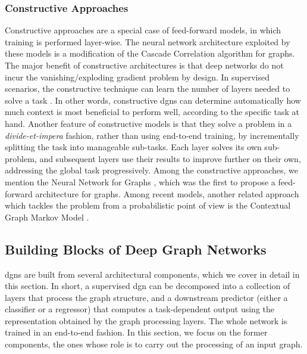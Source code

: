 \subsubsection*{Constructive Approaches}
Constructive approaches are a special case of feed-forward models, in which training is performed layer-wise. The neural network architecture exploited by these models is a modification of the Cascade Correlation algorithm \citep{fahlman1990cascor} for graphs. The major benefit of constructive architectures is that deep networks do not incur the vanishing/exploding gradient problem by design. In supervised scenarios, the constructive technique can learn the number of layers needed to solve a task \citep{marquez2018deepcascade,bianucci2000cascorchemistry}. In other words, constructive \glspl{dgn} can determine automatically how much context is most beneficial to perform well, according to the specific task at hand. Another feature of constructive models is that they solve a problem in a \emph{divide-et-impera} fashion, rather than using end-to-end training, by incrementally splitting the task into manageable sub-tasks. Each layer solves its own sub-problem, and subsequent layers use their results to improve further on their own, addressing the global task progressively. Among the constructive approaches, we mention the Neural Network for Graphs \citep{micheli2009nn4g}, which was the first to propose a feed-forward architecture for graphs. Among recent models, another related approach which tackles the problem from a probabilistic point of view is the Contextual Graph Markov Model \citep{bacciu2018contgraphmarkov}.

\subsection{Building Blocks of Deep Graph Networks}
\glspl{dgn} are built from several architectural components, which we cover in detail in this section. In short, a supervised \gls{dgn} can be decomposed into a collection of layers that process the graph structure, and a downstream predictor (either a classifier or a regressor) that computes a task-dependent output using the representation obtained by the graph processing layers. The whole network is trained in an end-to-end fashion. In this section, we focus on the former components, the ones whose role is to carry out the processing of an input graph.


